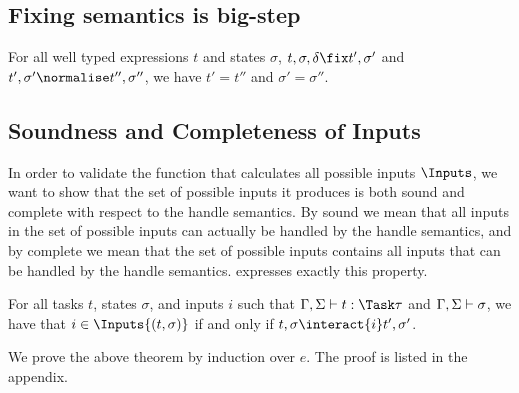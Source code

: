 \subsection{Fixing semantics is big-step}

\begin{lemma}
    For all well typed expressions $t$ and states $\sigma$,
    $t,\sigma,\delta\fix t',\sigma'$ and $t',\sigma'\normalise t'',\sigma''$,
    we have $t'=t''$ and $\sigma'=\sigma''$.
\end{lemma}
\subsection{Soundness and Completeness of Inputs}

In order to validate the function that calculates all possible inputs $\Inputs$,
we want to show that the set of possible inputs it produces is both sound and complete with respect to the handle semantics.
By sound we mean that all inputs in the set of possible inputs can actually be handled by the handle semantics,
and by complete we mean that the set of possible inputs contains all inputs that can be handled by the handle semantics.
 expresses exactly this property.

\begin{theorem}
  For all tasks $t$, states $\sigma$, and inputs $i$
  such that $\Gamma,\Sigma \infers t:\Task\tau$ and $\Gamma,\Sigma \vdash \sigma$,
  we have that $i \in \Inputs{(t,\sigma)}$ if and only if $t,\sigma \interact{i} t',\sigma'$.
  \label{thm:safety-i}
\end{theorem}

We prove the above theorem by induction over $e$. The proof is listed in the
appendix.
